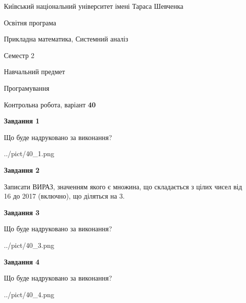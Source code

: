 \documentclass[12pt, ukrainian]{article}
\begin{document}
{{\begin {small}\par
{ \center  Київський національний університет імені Тараса Шевченка \par}
{\parbox {5 cm}{Освітня програма \hfill}{\parbox {8 cm}{Прикладна математика, Системний аналіз \hfill}}\parbox {5 cm}{\hfill Семестр 2}}\par
{\parbox {5 cm} {Навчальний предмет \hfill}\parbox {7 cm}{Програмування \hfill}\parbox {6cm}{\hfill}\par}\vspace{-7pt} \end{small}}{\center Контрольна робота, варіант  \No \textbf
{ 40 }\par}}
{
\begin {large}
{\begin {center}\textbf{Завдання 1}\end {center}}\par
Що буде надруковано за виконання?\par\par
\begin{center}
	{../pict/40_1.png}
\end{center}
\newpage

{\begin {center}\textbf{Завдання 2}\end {center}}\par
Записати ВИРАЗ, значенням якого є множина, що складається з цілих чисел від 16 до 2017 (включно), що діляться на 3.\par
\newpage

{\begin {center}\textbf{Завдання 3}\end {center}}\par
Що буде надруковано за виконання?
\begin{center}
	{../pict/40_3.png}
\end{center}
\newpage

{\begin {center}\textbf{Завдання 4}\end {center}}\par
Що буде надруковано за виконання?\par
\begin{center}
	{../pict/40_4.png}
\end{center}
\newpage


\end{large}}
\end{document}
